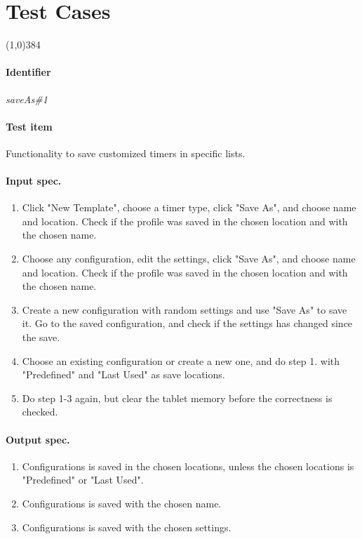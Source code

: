 \section{Test Cases}
\label{sec:test_cases}

\begin{center}
	\line(1,0){384}
\end{center}
\paragraph{Identifier}
	\textit{saveAs\#1}
\paragraph{Test item}
	Functionality to save customized timers in specific lists.
\paragraph{Input spec.}
	\begin{enumerate}
		\item Click "New Template", choose a timer type, click "Save As", and choose name and location. Check if the profile was saved in the chosen location and with the chosen name.
		\item Choose any configuration, edit the settings, click "Save As", and choose name and location. Check if the profile was saved in the chosen location and with the chosen name.
		\item Create a new configuration with random settings and use "Save As" to save it. Go to the saved configuration, and check if the settings has changed since the save.
		\item Choose an existing configuration or create a new one, and do step 1. with "Predefined" and "Last Used" as save locations.
		\item Do step 1-3 again, but clear the tablet memory before the correctness is checked.
	\end{enumerate}
\paragraph{Output spec.}
	\begin{enumerate}
		\item Configurations is saved in the chosen locations, unless the chosen locations is "Predefined" or "Last Used".
		\item Configurations is saved with the chosen name.
		\item Configurations is saved with the chosen settings.
	\end{enumerate}
